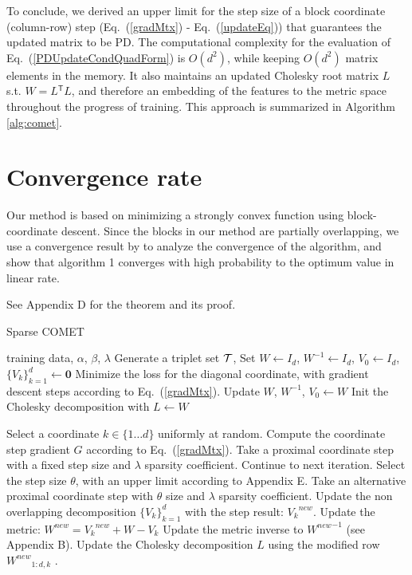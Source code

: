\documentclass[twoside,11pt]{article}
\newcommand\mat[1]{{#1}}
\renewcommand\vec[1]{\mathbf{#1}}
\newcommand{\T}{{}^\mathsf{T}}
\newcommand{\W}{\mat{W}}
\newcommand{\newW}{{\mat{W^{new}}}}
\newcommand{\Vk}{\mat{V_k}}
\newcommand{\Vz}{\mat{V_0}}
\newcommand{\Vgrc}{\{\Vk\}_{k=1}^{d}} %
\newcommand{\cholL}{\mat{L}}
\renewcommand{\eqref}[1]{Eq.~(\ref{#1})}
\begin{document}
To conclude, we derived an upper limit for the step size of a block coordinate (column-row) step (\eqref{gradMtx} - \eqref{updateEq}) that guarantees  the updated matrix to be PD. The computational complexity for the evaluation
of \eqref{PDUpdateCondQuadForm} is $O(d^2)$, while keeping $O(d^2)$ matrix elements in the memory.
It also maintains an updated Cholesky root matrix $\cholL$ s.t. $W = \cholL\T \cholL$, and therefore an embedding of the features to the metric space throughout the progress of training. This approach is summarized in Algorithm \ref{alg:comet}.


\section{Convergence rate}
Our method is based on minimizing a strongly convex function using block-coordinate descent. Since the blocks in our method are partially overlapping, we use a convergence result by \citet{richtarik2013optimal} to analyze the convergence of the algorithm, and show that algorithm 1 converges with high probability to the optimum value in linear rate.  

See Appendix D for the theorem and its proof.



\begin{algorithm}[t]
   \caption{Sparse COMET}
   \label{alg:spcomet}
\begin{algorithmic}[1]
    training data, $\alpha$, $\beta$, $\lambda$
   \STATE Generate a triplet set $\cal{T}$, Set  $\W  \leftarrow I_d$, $\W^{-1}  \leftarrow I_d$, $\Vz   \leftarrow I_d$, $\Vgrc \leftarrow \vec{0}$
   \STATE Minimize the loss for the diagonal coordinate, with gradient descent steps according to  \eqref{gradMtx}.
   \STATE Update $\W$, $\W^{-1}$, $\Vz \leftarrow \W$
    \STATE Init the Cholesky decomposition with $\cholL \leftarrow \W$
    
   \REPEAT 
   \STATE Select a coordinate $k \in \{1 \ldots d\}$ uniformly at random.
   \STATE Compute the coordinate step gradient $\mat{G}$ according to \eqref{gradMtx}.
   \STATE Take a proximal coordinate step with a fixed step size and $\lambda$ sparsity coefficient.
     \STATE Continue to next iteration.
   \ELSE 
      \STATE Select the step size $\theta$, with an upper limit according to Appendix E.
       \STATE Take an alternative proximal coordinate step with $\theta$ size and $\lambda$ sparsity coefficient.
      \STATE Update the non overlapping decomposition $\Vgrc$ with the step result: $\Vk^{new}$.
      \STATE Update the metric: $\newW = \Vk^{new} + \W - \Vk$
       \STATE Update the metric inverse to $\newW^{-1}$ (see Appendix B).
      \STATE Update the Cholesky decomposition $\cholL$ using the modified row $\newW_{1:d,k}$ \citep{Davis05rowchol}.
    \ENDIF
\end{algorithmic}
\end{algorithm}
\end{document}

